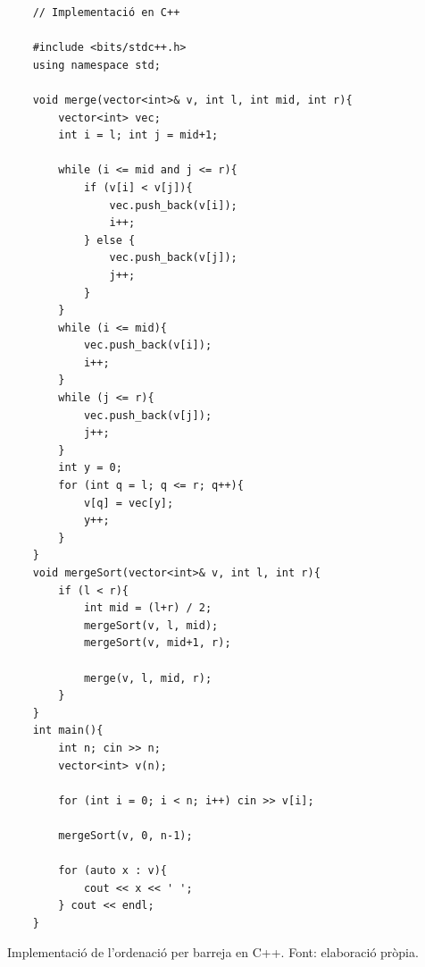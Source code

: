 \begin{longlisting}
    \begin{verbatim}
    // Implementació en C++
    
    #include <bits/stdc++.h>
    using namespace std;
    
    void merge(vector<int>& v, int l, int mid, int r){
        vector<int> vec;
        int i = l; int j = mid+1;
    
        while (i <= mid and j <= r){
            if (v[i] < v[j]){
                vec.push_back(v[i]);
                i++;
            } else {
                vec.push_back(v[j]);
                j++;
            }
        }
        while (i <= mid){
            vec.push_back(v[i]);
            i++;
        }
        while (j <= r){
            vec.push_back(v[j]);
            j++;
        }   
        int y = 0;
        for (int q = l; q <= r; q++){
            v[q] = vec[y];
            y++; 
        }
    }
    void mergeSort(vector<int>& v, int l, int r){
        if (l < r){
            int mid = (l+r) / 2;
            mergeSort(v, l, mid);
            mergeSort(v, mid+1, r);
    
            merge(v, l, mid, r);
        }
    }
    int main(){
        int n; cin >> n;
        vector<int> v(n);
        
        for (int i = 0; i < n; i++) cin >> v[i];
    
        mergeSort(v, 0, n-1);
    
        for (auto x : v){
            cout << x << ' ';
        } cout << endl;
    }
    \end{verbatim}
    \caption[Implementació de l'ordenació per barreja en C++.]{Implementació de l'ordenació per barreja en C++. Font: elaboració pròpia.}
    \label{Figura}
\end{longlisting}
